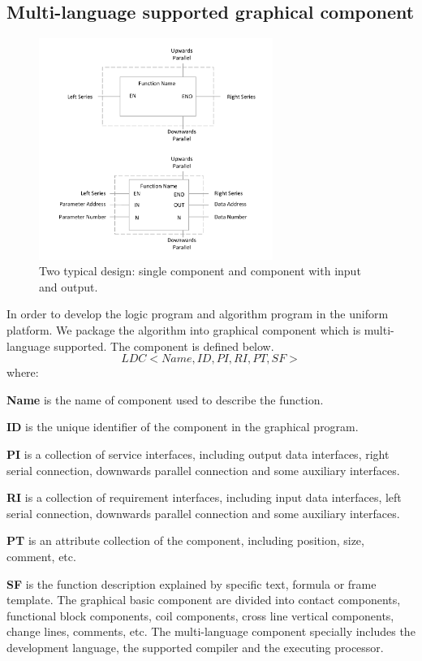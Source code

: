 \documentclass[journal,UTF8]{IEEEtran}
\begin{document}
\subsection{Multi-language supported graphical component}
\label{component}
\begin{figure}
	\centering
	\includegraphics[width=3in]{fig/FIG6.pdf}
	\caption{ Two typical design: single component and component with input and output.}
	\label{fig:Component}
\end{figure}
In order to develop the logic program and algorithm program in the uniform platform. We package the algorithm into graphical component which is multi-language supported. The component is defined below.
\begin{equation}
LDC<Name,ID,PI,RI,PT,SF>
\end{equation} 
where:

\textbf{Name} is the name of component used to describe the function.

\textbf{ID} is the unique identifier of the component in the graphical program.

\textbf{PI} is a collection of service interfaces, including output data interfaces, right serial connection, downwards parallel connection and some auxiliary interfaces.

\textbf{RI} is a collection of requirement interfaces, including input data interfaces, left serial connection, downwards parallel connection and some auxiliary interfaces.

\textbf{PT} is an attribute collection of the component, including position, size, comment, etc.

\textbf{SF} is the function description explained by specific text, formula or frame template. The graphical basic component are divided into contact components, functional block components, coil components, cross line vertical components, change lines, comments, etc. The multi-language component specially includes the development language, the supported compiler and the executing processor.
\end{document}
